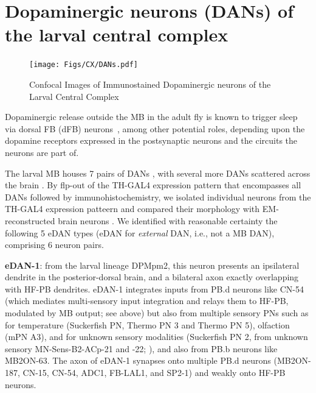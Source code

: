 

















\section{Dopaminergic neurons (DANs) of the larval central complex}
    
    \begin{figure}
        \centering
        \texttt{[image: Figs/CX/DANs.pdf]}
        \caption{Confocal Images of Immunostained Dopaminergic neurons of the Larval Central Complex}
        \label{DANs}
    \end{figure}

Dopaminergic release outside the MB in the adult fly is known to trigger sleep via dorsal FB (dFB) neurons~\citep{pimentel2016sleep}, among other potential roles, depending upon the dopamine receptors expressed in the postsynaptic neurons and the circuits the neurons are part of.

The larval MB houses 7 pairs of DANs \citep{eichler2017complete}, with several more DANs scattered across the brain \citep{selcho2009thgal4}. By flp-out of the TH-GAL4 expression pattern that encompasses all DANs \citep{selcho2009thgal4} followed by immunohistochemistry, we isolated individual neurons from the TH-GAL4 expression patteern and compared their morphology with EM-reconstructed brain neurons \citep{winding2023connectome}. We identified with reasonable certainty the following 5 eDAN types (eDAN for \textit{external} DAN, i.e., not a MB DAN), comprising 6 neuron pairs.

\textbf{eDAN-1}: from the larval lineage DPMpm2, this neuron presents an ipsilateral dendrite in the posterior-dorsal brain, and a bilateral axon exactly overlapping with HF-PB dendrites. eDAN-1 integrates inputs from PB.d neurons like CN-54 (which mediates multi-sensory input integration and relays them to HF-PB, modulated by MB output; see above) but also from multiple sensory PNs such as for temperature (Suckerfish PN, Thermo PN 3 and Thermo PN 5), olfaction (mPN A3), and for unknown sensory modalities (Suckerfish PN 2, from unknown sensory MN-Sens-B2-ACp-21 and -22; \citep{miroschnikow2018convergence}), and also from PB.b neurons like MB2ON-63. The axon of eDAN-1 synapses onto multiple PB.d neurons (MB2ON-187, CN-15, CN-54, ADC1, FB-LAL1, and SP2-1) and weakly onto HF-PB neurons.


